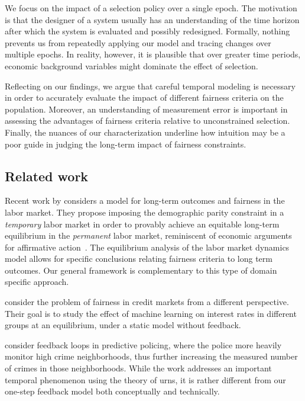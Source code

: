 We focus on the impact of a selection policy over a single epoch. The
motivation is that the designer of a system usually has an understanding of the
time horizon after which the system is evaluated and possibly redesigned.
Formally, nothing prevents us from repeatedly applying our model and tracing
changes over multiple epochs. In reality, however, it is plausible that over greater time
periods, economic background variables might dominate the effect of selection.


Reflecting on our findings, we argue that careful temporal modeling is necessary
in order to accurately evaluate the impact of different fairness criteria on the
population. Moreover, an understanding of measurement error is important in
assessing the advantages of fairness criteria relative to unconstrained
selection. Finally, the nuances of our characterization underline how
intuition may be a poor guide in judging the long-term impact of fairness
constraints.

\subsection{Related work}


Recent work by \citet{hu18shortterm} considers a model for long-term outcomes and fairness in the labor market. They propose imposing the demographic parity constraint in a \emph{temporary} labor market in order to provably achieve an equitable long-term equilibrium in the \emph{permanent} labor market, reminiscent of economic arguments for affirmative action~\citep{foster1992economic}. The equilibrium analysis of the labor market dynamics model allows for specific conclusions relating fairness criteria to long term outcomes. Our general framework is complementary to this type of domain specific approach.

\citet{fuster2017predictably}
consider the problem of fairness in credit markets from a different perspective. Their goal is to study the effect of machine learning on interest rates in different groups at an equilibrium, under a static model without feedback.

\citet{ensign2017runaway} consider feedback loops in predictive
policing, where the police more heavily monitor high crime neighborhoods,
thus further increasing the measured number of crimes in those neighborhoods.
While the work addresses an important temporal phenomenon using the theory of urns, it is rather different from our one-step feedback model both conceptually and technically.

